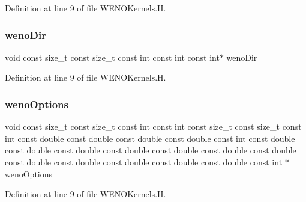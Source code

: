 Definition at line 9 of file W\+E\+N\+O\+Kernels.\+H.

\hypertarget{WENOKernels_8H_ad666ee82e2a1fc16c063480c239ae188}{}\label{WENOKernels_8H_ad666ee82e2a1fc16c063480c239ae188} 
\subsubsection{\texorpdfstring{weno\+Dir}{wenoDir}}
{\footnotesize\ttfamily void const size\+\_\+t const size\+\_\+t const int const int const int$\ast$ weno\+Dir}



Definition at line 9 of file W\+E\+N\+O\+Kernels.\+H.

\hypertarget{WENOKernels_8H_ab0a9a4f63f5ec810f436c1071ccb6eea}{}\label{WENOKernels_8H_ab0a9a4f63f5ec810f436c1071ccb6eea} 
\subsubsection{\texorpdfstring{weno\+Options}{wenoOptions}}
{\footnotesize\ttfamily void const size\+\_\+t const size\+\_\+t const int const int const size\+\_\+t const size\+\_\+t const int const double const double const double const double const int const double const double const double const double const double const double const double const double const double const double const double const double const int $\ast$ weno\+Options}



Definition at line 9 of file W\+E\+N\+O\+Kernels.\+H.

